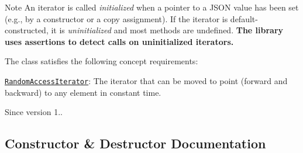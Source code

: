 \begin{DoxyNote}{Note}
An iterator is called {\itshape initialized} when a pointer to a J\+S\+ON value has been set (e.\+g., by a constructor or a copy assignment). If the iterator is default-\/constructed, it is {\itshape uninitialized} and most methods are undefined. {\bfseries The library uses assertions to detect calls on uninitialized iterators.}
\end{DoxyNote}
The class satisfies the following concept requirements\+:
\begin{DoxyItemize}
\item \href{http://en.cppreference.com/w/cpp/concept/RandomAccessIterator}{\tt Random\+Access\+Iterator}\+: The iterator that can be moved to point (forward and backward) to any element in constant time.
\end{DoxyItemize}

\begin{DoxySince}{Since}
version 1.. 
\end{DoxySince}


\subsection{Constructor \& Destructor Documentation}
\hypertarget{classnlohmann_1_1basic__json_1_1const__iterator_a23de834b11bd895209aa65c100ab9ceb}{}\label{classnlohmann_1_1basic__json_1_1const__iterator_a23de834b11bd895209aa65c100ab9ceb} 
